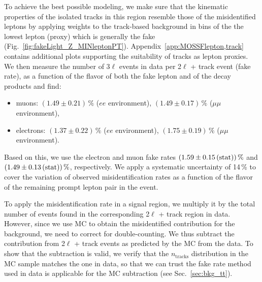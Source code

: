 To achieve the best possible modeling, we make sure that the kinematic properties of the isolated tracks in this region resemble those of the misidentified leptons by applying weights to the track-based background in bins of the the lowest \pt lepton (proxy) which is generally the fake (Fig.~\ref{fig:fakeLight_Z_MINleptonPT}). Appendix~\ref{app:MOSSFlepton,track} contains additional plots supporting the suitability of tracks as lepton proxies. We then measure the number of 3$\ell$ events in data per 2$\ell$ + track event (fake rate), as a function of the flavor of both the fake lepton and of the \Z decay products and find:
\begin{itemize}
	\item muons: $(1.49 \pm 0.21)\,\%$ ($ee$ environment), $(1.49 \pm 0.17)\,\%$ ($\mu\mu$ environment),
	\item electrons: $(1.37 \pm 0.22)\,\%$ ($ee$ environment), $(1.75 \pm 0.19)\,\%$ ($\mu\mu$ environment).
\end{itemize}
Based on this, we use the electron and muon fake rates $(1.59 \pm 0.15\,\text{(stat)})\,\%$ and $(1.49 \pm 0.13\,\text{(stat)})\,\%$, respectively. We apply a systematic uncertainty of 14\,\% to cover the variation of observed misidentification rates as a function of the flavor of the remaining prompt lepton pair in the event.

To apply the misidentification rate in a signal region, we multiply it by the total number of events found in the corresponding 2$\ell$ + track region in data. However, since we use MC to obtain the misidentified contribution for the \ttbar background, we need to correct for double-counting. We thus subtract the contribution from 2$\ell$ + track events as predicted by the \ttbar MC from the data. To show that the subtraction is valid, we verify that the $n_\textrm{tracks}$ distribution in the \ttbar MC sample matches the one in data, so that we can trust the fake rate method used in data is applicable for the \ttbar MC subtraction (see Sec.~\ref{sec:bkg_tt}).

